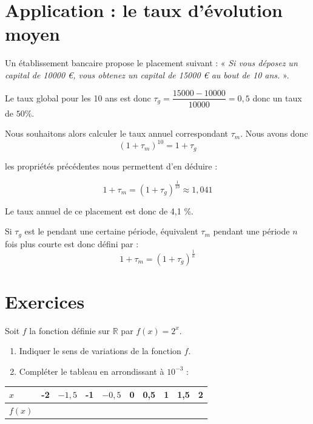 \documentclass[french]{book}
\begin{document}
\section{Application : le taux d'évolution moyen}

\begin{exemple}
Un établissement bancaire propose le placement suivant :
« \textit{Si vous déposez un capital de 10000 €, vous obtenez un capital de 15000 € au bout de 10 ans.} ».

Le taux global pour les 10 ans est donc $\tau_g = \dfrac{15000-10000}{10000}= 0,5$ donc un taux de $50\%$.

Nous souhaitons alors calculer le taux annuel correspondant $\tau_m$. Nous avons donc $$(1+\tau_m)^{10} =1+\tau_g$$ 

les propriétés précédentes nous permettent d'en déduire :

$$1+\tau_m =(1+\tau_g)^{\frac{1}{10}} \approx 1,041$$

Le taux annuel de ce placement est donc de 4,1 \%.
\end{exemple}

\begin{prop}
Si $\tau_g$ est le  pendant une certaine période,  équivalent $\tau_m$ pendant une période $n$ fois plus courte est donc défini par :
$$1+\tau_m =(1+\tau_g)^\frac{1}{n}$$
\end{prop}

\newpage
\section{Exercices}



\begin{exocor}
Soit $f$ la fonction définie sur $\mathbb{R}$ par $f(x)=2^{x}$.

\begin{enumerate}
\item Indiquer le sens de variations de la fonction $f$.
\item Compléter le tableau en arrondissant à $10^{-3}$ :
\end{enumerate}

\begin{center}
\begin{tabular}{|l|l|l|l|l|l|l|l|l|l|}
\hline$x$ & -2 & $-1,5$ & -1 & $-0,5$ & 0 & 0,5 & 1 & 1,5 & 2 \\
\hline$f(x)$ & & & & & & & & & \\
\hline
\end{tabular}
\end{center}

\end{exocor}
\end{document}
